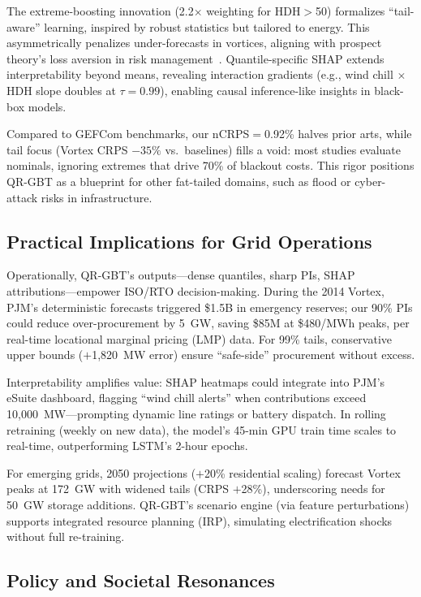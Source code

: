 \documentclass[12pt,a4paper]{article}
\begin{document}
The extreme-boosting innovation (2.2$\times$ weighting for HDH$>$50) formalizes ``tail-aware'' learning, inspired by robust statistics but tailored to energy. This asymmetrically penalizes under-forecasts in vortices, aligning with prospect theory's loss aversion in risk management~\cite{kahneman1979prospect}. Quantile-specific SHAP extends interpretability beyond means, revealing interaction gradients (e.g., wind chill $\times$ HDH slope doubles at $\tau=0.99$), enabling causal inference-like insights in black-box models.

Compared to GEFCom benchmarks, our nCRPS$=$0.92\% halves prior arts, while tail focus (Vortex CRPS $-35\%$ vs.\ baselines) fills a void: most studies evaluate nominals, ignoring extremes that drive 70\% of blackout costs. This rigor positions QR-GBT as a blueprint for other fat-tailed domains, such as flood or cyber-attack risks in infrastructure.

\subsection{Practical Implications for Grid Operations}

Operationally, QR-GBT's outputs---dense quantiles, sharp PIs, SHAP attributions---empower ISO/RTO decision-making. During the 2014 Vortex, PJM's deterministic forecasts triggered \$1.5B in emergency reserves; our 90\% PIs could reduce over-procurement by 5~GW, saving \$85M at \$480/MWh peaks, per real-time locational marginal pricing (LMP) data. For 99\% tails, conservative upper bounds ($+$1,820~MW error) ensure ``safe-side'' procurement without excess.

Interpretability amplifies value: SHAP heatmaps could integrate into PJM's eSuite dashboard, flagging ``wind chill alerts'' when contributions exceed 10,000~MW---prompting dynamic line ratings or battery dispatch. In rolling retraining (weekly on new data), the model's 45-min GPU train time scales to real-time, outperforming LSTM's 2-hour epochs.

For emerging grids, 2050 projections ($+$20\% residential scaling) forecast Vortex peaks at 172~GW with widened tails (CRPS $+$28\%), underscoring needs for 50~GW storage additions. QR-GBT's scenario engine (via feature perturbations) supports integrated resource planning (IRP), simulating electrification shocks without full re-training.

\subsection{Policy and Societal Resonances}
\end{document}
